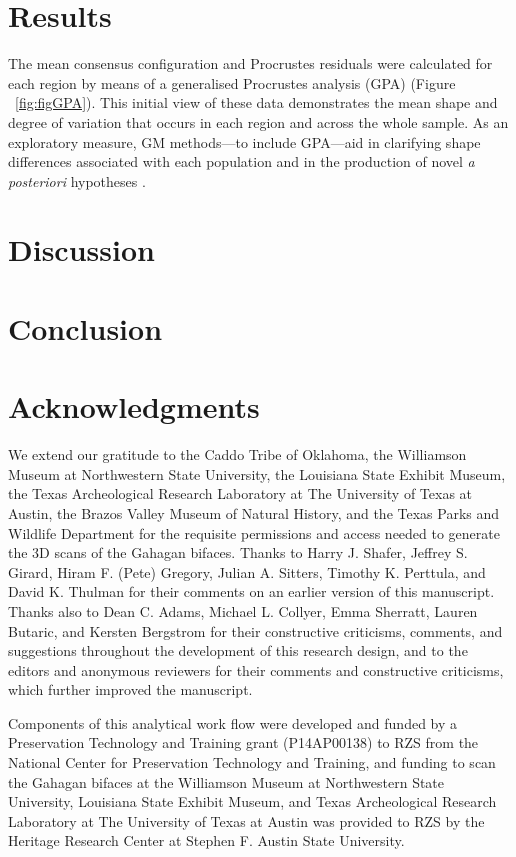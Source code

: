 \documentclass[review]{elsarticle}
\begin{document}
\section*{Results}

The mean consensus configuration and Procrustes residuals were calculated for each region by means of a generalised Procrustes analysis (GPA) \citep[Figure 3]{RN1720} (Figure ~\ref{fig:figGPA}). This initial view of these data demonstrates the mean shape and degree of variation that occurs in each region and across the whole sample. As an exploratory measure, GM methods---to include GPA---aid in clarifying shape differences associated with each population and in the production of novel \textit{a posteriori} hypotheses \citep{RN1720}.

\section*{Discussion}

\section*{Conclusion}

\section*{Acknowledgments}

We extend our gratitude to the Caddo Tribe of Oklahoma, the Williamson Museum at Northwestern State University, the Louisiana State Exhibit Museum, the Texas Archeological Research Laboratory at The University of Texas at Austin, the Brazos Valley Museum of Natural History, and the Texas Parks and Wildlife Department for the requisite permissions and access needed to generate the 3D scans of the Gahagan bifaces. Thanks to Harry J. Shafer, Jeffrey S. Girard, Hiram F. (Pete) Gregory, Julian A. Sitters, Timothy K. Perttula, and David K. Thulman for their comments on an earlier version of this manuscript. Thanks also to Dean C. Adams, Michael L. Collyer, Emma Sherratt, Lauren Butaric, and Kersten Bergstrom for their constructive criticisms, comments, and suggestions throughout the development of this research design, and to the editors and anonymous reviewers for their comments and constructive criticisms, which further improved the manuscript. 

Components of this analytical work flow were developed and funded by a Preservation Technology and Training grant (P14AP00138) to RZS from the National Center for Preservation Technology and Training, and funding to scan the Gahagan bifaces at the Williamson Museum at Northwestern State University, Louisiana State Exhibit Museum, and Texas Archeological Research Laboratory at The University of Texas at Austin was provided to RZS by the Heritage Research Center at Stephen F. Austin State University.


\end{document}
